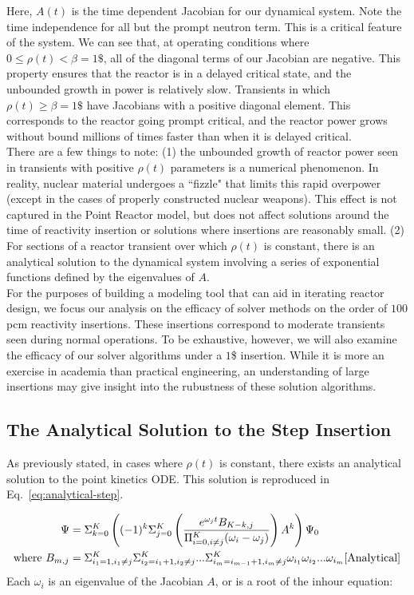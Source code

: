 \documentclass[review,onefignum,onetabnum]{siamart171218}
\begin{document}
Here, $A(t)$ is the time dependent Jacobian for our dynamical system. Note the
time independence for all but the prompt neutron term. This is a critical feature
of the system. We can see that, at operating conditions where $0 \leq \rho(t) < \beta = 1\$$,
all of the diagonal terms of our Jacobian are negative. This property ensures
that the reactor is in a delayed critical state, and the unbounded growth in power
is relatively slow. Transients in which $\rho(t) \geq \beta = 1\$$ have Jacobians with
a positive diagonal element. This corresponds to the reactor going prompt critical, and
the reactor power grows without bound millions of times faster than when it is delayed
critical. \\

There are a few things to note: (1) the unbounded growth of reactor power seen
in transients with positive $\rho(t)$ parameters is a numerical phenomenon. In reality,
nuclear material undergoes a ``fizzle" that limits this rapid overpower (except
in the cases of properly constructed nuclear weapons). This effect is not captured in the Point Reactor
model, but does not affect solutions around the time of reactivity insertion or solutions
where insertions are reasonably small. (2) For
sections of a reactor transient over which $\rho(t)$ is constant, there is an
analytical solution to the dynamical system involving a series of exponential functions
defined by the eigenvalues of $A$. \\

For the purposes of building a modeling tool that can aid in iterating reactor design,
we focus our analysis on the efficacy of solver methods on the order of $100$ pcm
reactivity insertions. These insertions correspond to moderate transients seen during
normal operations. To be exhaustive, however, we will also examine the efficacy of our
solver algorithms under a $1$\$ insertion. While it is more an exercise in academia than
practical engineering, an understanding of large insertions may give insight into the
rubustness of these solution  algorithms.

\subsection{The Analytical Solution to the Step Insertion}
As previously stated, in cases where $\rho(t)$ is constant, there exists an
analytical solution to the point kinetics ODE. This solution is reproduced in
Eq.~\cref{eq:analytical-step}.

\begin{align}
  \label{eq:analytical-step}
  \Psi &= \Sigma_{k=0}^K \left( (-1)^k \Sigma_{j=0}^K \left( \frac{e^{\omega_jt}B_{K-k,j}}{\Pi_{i=0, i\neq j}^K (\omega_i - \omega_j)}\right) A^k\right)\Psi_0\\
  \text{where } B_{m,j} &= \Sigma_{i_1 = 1, i_1 \neq j}^K \Sigma_{i_2 = i_1 + 1, i_2 \neq j}^K ...\Sigma_{i_m = i_{m-1} + 1, i_m \neq j}^K \omega_{i_1}\omega_{i_2}...\omega_{i_m}
  \cite{Analytical}
\end{align}
Each $\omega_i$ is an eigenvalue of the Jacobian $A$, or is a root of the inhour
equation:
\end{document}
